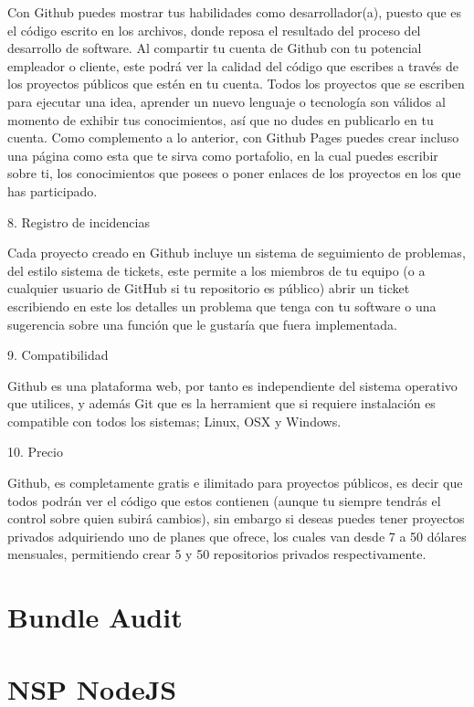 Con Github puedes mostrar tus habilidades como desarrollador(a), puesto que es el código escrito en los archivos, donde reposa el resultado del proceso del desarrollo de software. Al compartir tu cuenta de Github con tu potencial empleador o cliente, este podrá ver la calidad del código que escribes a través de los proyectos públicos que estén en tu cuenta. Todos los proyectos que se escriben para ejecutar una idea, aprender un nuevo lenguaje o tecnología son válidos al momento de exhibir tus conocimientos, así que no dudes en publicarlo en tu cuenta. Como complemento a lo anterior, con Github Pages puedes crear incluso una página como esta que te sirva como portafolio, en la cual puedes escribir sobre ti, los conocimientos que posees o poner enlaces de los proyectos en los que has participado.

8. Registro de incidencias

Cada proyecto creado en Github incluye un sistema de seguimiento de problemas, del estilo sistema de tickets, este permite a los miembros de tu equipo (o a cualquier usuario de GitHub si tu repositorio es público) abrir un ticket escribiendo en este los detalles un problema que tenga con tu software o una sugerencia sobre una función que le gustaría que fuera implementada.

9. Compatibilidad

Github es una plataforma web, por tanto es independiente del sistema operativo que utilices, y además Git que es la herramient que si requiere instalación es compatible con todos los sistemas; Linux, OSX y Windows.

10. Precio

Github, es completamente gratis e ilimitado para proyectos públicos, es decir que todos podrán ver el código que estos contienen (aunque tu siempre tendrás el control sobre quien subirá cambios), sin embargo si deseas puedes tener proyectos privados adquiriendo uno de planes que ofrece, los cuales van desde 7 a 50 dólares mensuales, permitiendo crear 5 y 50 repositorios privados respectivamente.



\section{Bundle Audit}



\section{NSP NodeJS}



